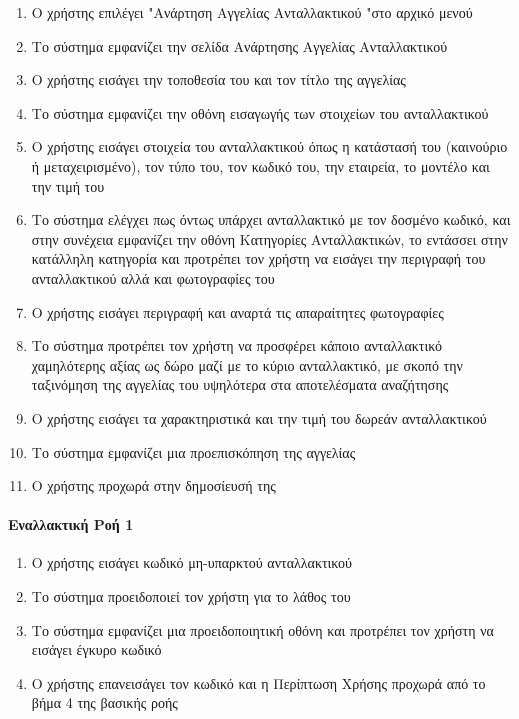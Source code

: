 \documentclass{../ol-softwaremanual}
\begin{document}
	\begin{enumerate}
		\item Ο χρήστης επιλέγει \en"\gr Ανάρτηση Αγγελίας Ανταλλακτικού \en"\gr στο αρχικό μενού
		\item Το σύστημα εμφανίζει την σελίδα Ανάρτησης Αγγελίας Ανταλλακτικού
		\item Ο χρήστης εισάγει την τοποθεσία του και τον τίτλο της αγγελίας
		\item Το σύστημα εμφανίζει την οθόνη εισαγωγής των στοιχείων του ανταλλακτικού
		\item Ο χρήστης εισάγει στοιχεία του ανταλλακτικού όπως η κατάστασή του (καινούριο ή μεταχειρισμένο), τον τύπο του, τον κωδικό του, την εταιρεία, το μοντέλο και την τιμή του
		\item Το σύστημα ελέγχει πως όντως υπάρχει ανταλλακτικό με τον δοσμένο κωδικό, και στην συνέχεια εμφανίζει την οθόνη Κατηγορίες Ανταλλακτικών, το εντάσσει στην κατάλληλη κατηγορία και προτρέπει τον χρήστη να εισάγει την περιγραφή του ανταλλακτικού αλλά και φωτογραφίες του
		\item Ο χρήστης εισάγει περιγραφή και αναρτά τις απαραίτητες φωτογραφίες
		\item Το σύστημα προτρέπει τον χρήστη να προσφέρει κάποιο ανταλλακτικό χαμηλότερης αξίας ως δώρο μαζί με το κύριο ανταλλακτικό, με σκοπό την ταξινόμηση της αγγελίας του υψηλότερα στα αποτελέσματα αναζήτησης
		\item Ο χρήστης εισάγει τα χαρακτηριστικά και την τιμή του δωρεάν ανταλλακτικού
		\item Το σύστημα εμφανίζει μια προεπισκόπηση της αγγελίας
		\item Ο χρήστης προχωρά στην δημοσίευσή της
	\end{enumerate}
	
	
	\paragraph{Εναλλακτική Ροή 1}
	
	\begin{enumerate}
		\item Ο χρήστης εισάγει κωδικό μη-υπαρκτού ανταλλακτικού
		\item Το σύστημα προειδοποιεί τον χρήστη για το λάθος του
		\item Το σύστημα εμφανίζει μια προειδοποιητική οθόνη και προτρέπει τον χρήστη να εισάγει έγκυρο κωδικό
		\item Ο χρήστης επανεισάγει τον κωδικό και η Περίπτωση Χρήσης προχωρά από το βήμα 4 της βασικής ροής
	\end{enumerate}
	
\end{document}

